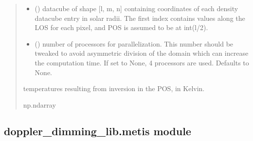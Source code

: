 \documentclass[letterpaper,10pt,english]{sphinxmanual}
\begin{document}
\begin{fulllineitems}
\begin{quote}
\begin{description}
\begin{itemize}
\item {} 
\sphinxAtStartPar
{} () \textendash{} datacube of shape {[}l, m, n{]} containing coordinates of each density datacube entry in solar radii. The first index contains values along the LOS for each pixel, and POS is assumed to be at int(l/2).

\item {} 
\sphinxAtStartPar
{} (\sphinxstyleliteralemphasis{\sphinxupquote{, }}) \textendash{} number of processors for parallelization. This number should be tweaked to avoid asymmetric division of the domain which can increase the computation time. If set to None, 4 processors are used. Defaults to None.

\end{itemize}

\sphinxAtStartPar
temperatures resulting from inversion in the POS, in Kelvin.

\sphinxAtStartPar
np.ndarray

\end{description}\end{quote}

\end{fulllineitems}



\subsection{doppler\_dimming\_lib.metis module}
\label{\detokenize{doppler_dimming_lib:module-doppler_dimming_lib.metis}}\label{\detokenize{doppler_dimming_lib:doppler-dimming-lib-metis-module}}
\end{document}
